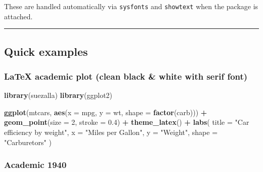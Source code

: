 \documentclass[
]{article}
\newenvironment{Shaded}{\begin{snugshade}}{\end{snugshade}}
\newcommand{\AttributeTok}[1]{\textcolor[rgb]{0.13,0.29,0.53}{#1}}
\newcommand{\DecValTok}[1]{\textcolor[rgb]{0.00,0.00,0.81}{#1}}
\newcommand{\FloatTok}[1]{\textcolor[rgb]{0.00,0.00,0.81}{#1}}
\newcommand{\FunctionTok}[1]{\textcolor[rgb]{0.13,0.29,0.53}{\textbf{#1}}}
\newcommand{\NormalTok}[1]{#1}
\newcommand{\SpecialCharTok}[1]{\textcolor[rgb]{0.81,0.36,0.00}{\textbf{#1}}}
\newcommand{\StringTok}[1]{\textcolor[rgb]{0.31,0.60,0.02}{#1}}
\begin{document}
These are handled automatically via \texttt{sysfonts} and
\texttt{showtext} when the package is attached.

\begin{center}\rule{0.5\linewidth}{0.5pt}\end{center}

\subsection{Quick examples}\label{quick-examples}

\subsubsection{LaTeX academic plot (clean black \& white with serif
font)}\label{latex-academic-plot-clean-black-white-with-serif-font}

\begin{Shaded}
\begin{Highlighting}[]
\FunctionTok{library}\NormalTok{(suezalla)}
\FunctionTok{library}\NormalTok{(ggplot2)}

\FunctionTok{ggplot}\NormalTok{(mtcars, }\FunctionTok{aes}\NormalTok{(}\AttributeTok{x =}\NormalTok{ mpg, }\AttributeTok{y =}\NormalTok{ wt, }\AttributeTok{shape =} \FunctionTok{factor}\NormalTok{(carb))) }\SpecialCharTok{+}
  \FunctionTok{geom\_point}\NormalTok{(}\AttributeTok{size =} \DecValTok{2}\NormalTok{, }\AttributeTok{stroke =} \FloatTok{0.4}\NormalTok{) }\SpecialCharTok{+}
  \FunctionTok{theme\_latex}\NormalTok{() }\SpecialCharTok{+}
  \FunctionTok{labs}\NormalTok{(}
    \AttributeTok{title =} \StringTok{"Car efficiency by weight"}\NormalTok{,}
    \AttributeTok{x =} \StringTok{"Miles per Gallon"}\NormalTok{,}
    \AttributeTok{y =} \StringTok{"Weight"}\NormalTok{,}
    \AttributeTok{shape =} \StringTok{"Carburetors"}
\NormalTok{  )}
\end{Highlighting}
\end{Shaded}

\subsubsection{Academic 1940}\label{academic-1940}
\end{document}
